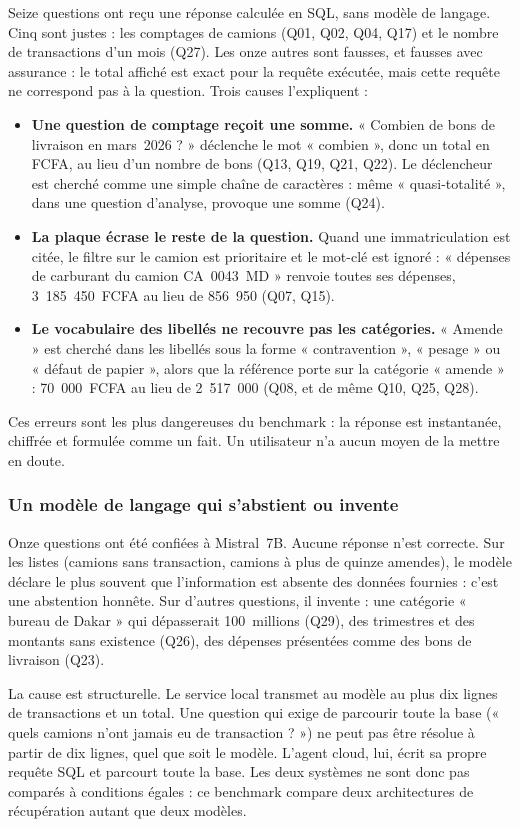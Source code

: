 Seize questions ont reçu une réponse calculée en SQL, sans modèle de langage. Cinq sont justes : les comptages de camions (Q01, Q02, Q04, Q17) et le nombre de transactions d'un mois (Q27). Les onze autres sont fausses, et fausses avec assurance : le total affiché est exact pour la requête exécutée, mais cette requête ne correspond pas à la question. Trois causes l'expliquent :
\begin{itemize}
    \item \textbf{Une question de comptage reçoit une somme.} « Combien de bons de livraison en mars~2026 ? » déclenche le mot « combien », donc un total en FCFA, au lieu d'un nombre de bons (Q13, Q19, Q21, Q22). Le déclencheur est cherché comme une simple chaîne de caractères : même « quasi-totalité », dans une question d'analyse, provoque une somme (Q24).
    \item \textbf{La plaque écrase le reste de la question.} Quand une immatriculation est citée, le filtre sur le camion est prioritaire et le mot-clé est ignoré : « dépenses de carburant du camion CA~0043~MD » renvoie toutes ses dépenses, 3~185~450~FCFA au lieu de 856~950 (Q07, Q15).
    \item \textbf{Le vocabulaire des libellés ne recouvre pas les catégories.} « Amende » est cherché dans les libellés sous la forme « contravention », « pesage » ou « défaut de papier », alors que la référence porte sur la catégorie « amende » : 70~000~FCFA au lieu de 2~517~000 (Q08, et de même Q10, Q25, Q28).
\end{itemize}
Ces erreurs sont les plus dangereuses du benchmark : la réponse est instantanée, chiffrée et formulée comme un fait. Un utilisateur n'a aucun moyen de la mettre en doute.

\subsubsection{Un modèle de langage qui s'abstient ou invente}

Onze questions ont été confiées à Mistral~7B. Aucune réponse n'est correcte. Sur les listes (camions sans transaction, camions à plus de quinze amendes), le modèle déclare le plus souvent que l'information est absente des données fournies : c'est une abstention honnête. Sur d'autres questions, il invente : une catégorie « bureau de Dakar » qui dépasserait 100~millions (Q29), des trimestres et des montants sans existence (Q26), des dépenses présentées comme des bons de livraison (Q23).

La cause est structurelle. Le service local transmet au modèle au plus dix lignes de transactions et un total. Une question qui exige de parcourir toute la base (« quels camions n'ont jamais eu de transaction ? ») ne peut pas être résolue à partir de dix lignes, quel que soit le modèle. L'agent cloud, lui, écrit sa propre requête SQL et parcourt toute la base. Les deux systèmes ne sont donc pas comparés à conditions égales : ce benchmark compare deux architectures de récupération autant que deux modèles.

